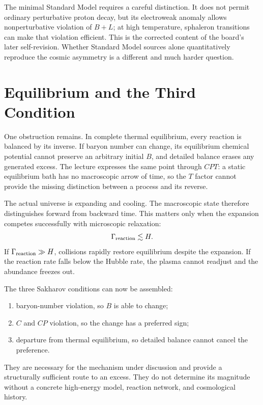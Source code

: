 The minimal Standard Model requires a careful distinction. It does not permit ordinary perturbative proton decay, but its electroweak anomaly allows nonperturbative violation of \(B+L\); at high temperature, sphaleron transitions can make that violation efficient. This is the corrected content of the board's later self-revision. Whether Standard Model sources alone quantitatively reproduce the cosmic asymmetry is a different and much harder question.

\section{Equilibrium and the Third Condition}

One obstruction remains. In complete thermal equilibrium, every reaction is balanced by its inverse. If baryon number can change, its equilibrium chemical potential cannot preserve an arbitrary initial \(B\), and detailed balance erases any generated excess. The lecture expresses the same point through \(CPT\): a static equilibrium bath has no macroscopic arrow of time, so the \(T\) factor cannot provide the missing distinction between a process and its reverse.

The actual universe is expanding and cooling. The macroscopic state therefore distinguishes forward from backward time. This matters only when the expansion competes successfully with microscopic relaxation:
\begin{equation}
\Gamma_{\rm reaction}\lesssim H.
\label{eq:c08-freezeout-condition}
\end{equation}
If \(\Gamma_{\rm reaction}\gg H\), collisions rapidly restore equilibrium despite the expansion. If the reaction rate falls below the Hubble rate, the plasma cannot readjust and the abundance freezes out.

\begin{classroomqa}
\end{classroomqa}

The three Sakharov conditions can now be assembled:
\begin{enumerate}
\item baryon-number violation, so \(B\) is able to change;
\item \(C\) and \(CP\) violation, so the change has a preferred sign;
\item departure from thermal equilibrium, so detailed balance cannot cancel the preference.
\end{enumerate}
They are necessary for the mechanism under discussion and provide a structurally sufficient route to an excess. They do not determine its magnitude without a concrete high-energy model, reaction network, and cosmological history.

